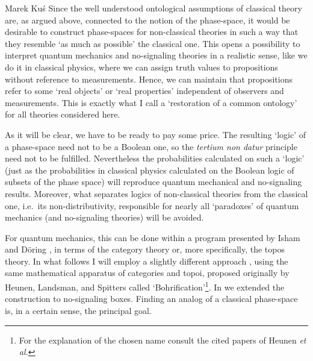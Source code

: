 \begin{artengenv}{Marek Ku\'s}
Since the well understood ontological assumptions of classical theory are, as argued above, connected to the notion of the phase-space, it would be desirable to construct phase-spaces for non-classical theories in such a way that they resemble `as much as possible' the classical one. This opens a possibility to interpret quantum mechanics and no-signaling theories in a realistic sense, like we do it in classical physics, where we can assign truth values to propositions without reference to measurements. Hence, we can maintain that propositions refer to some `real objects' or `real properties' independent of observers and measurements. This is exactly what I call a `restoration of a common ontology' for all theories considered here.    

As it will be clear, we have to be ready to pay some price. The resulting `logic' of a phase-space need not to be a Boolean one, so the \textit{tertium non datur} principle need not to be fulfilled. Nevertheless the probabilities calculated on such a `logic' (just as the probabilities in classical physics calculated on the Boolean logic of subsets of the phase space) will reproduce quantum mechanical and no-signaling results. Moreover, what separates logics of non-classical theories from the classical one, i.e.\ its non-distributivity, responsible for nearly all `paradoxes' of quantum mechanics (and no-signaling theories) will be avoided.        

For quantum mechanics, this can be done within a program presented by Isham and D\"oring \parencite*{doring_topos_2008,doring_topos_2008-1,doring_topos_2008-2,doring_topos_2008-3}, in terms of the category theory or, more specifically, the topos theory. In what follows I will employ a slightly different approach \parencite{wolters_comparison_2013}, using the same mathematical apparatus of categories and topoi, proposed originally by Heunen, Landsman, and Spitters \parencite*{heunen_topos_2009,heunen_gelfand_2011} called `Bohrification'\footnote{For the explanation of the chosen name consult the cited papers of Heunen\textit{ et al.}}. In \parencite{gutt_non-signalling_2016} we extended  the construction  to no-signaling boxes. Finding an analog of a classical phase-space is, in a certain sense, the principal goal. 


\end{artengenv}
